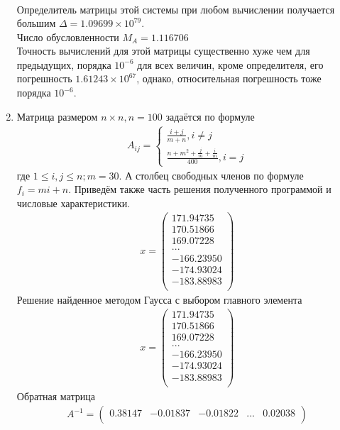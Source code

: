 \documentclass[a4paper,12pt,titlepage,finall]{article}
\begin{document}
\begin{enumerate}
\begin{align*}
\end{align*}
Определитель матрицы этой системы при любом вычислении получается большим $\Delta = 1.09699 \times 10^79$.\\
Число обусловленности $M_A = 1.116706$\\
Точность вычислений для этой матрицы существенно хуже чем для предыдущих, порядка $10^{-6}$ для всех величин, кроме определителя, его погрешность $1.61243 \times 10^{67}$, однако, относительная погрешность тоже порядка $10^{-6}$.
\item
Матрица размером $n \times n, n = 100$ задаётся по формуле
\begin{align}
A_{ij} = \left\{
\begin{array}{ll}
\frac{i+j}{m+n}, i \neq j\\
\frac{n + m^2 + \frac{j}{m} + \frac{i}{m}}{400}, i = j
\end{array}
\right.
\end{align}
где $1 \leq i,j \leq n; m = 30$. А столбец свободных членов по формуле $f_i = mi + n$. Приведём также часть решения полученного программой и числовые характеристики.
\begin{align*}
x = \begin{pmatrix}
171.94735 \\
 170.51866 \\
 169.07228 \\
   ...\\
-166.23950 \\
-174.93024 \\
-183.88983 \\
\end{pmatrix}
\end{align*}
Решение найденное методом Гаусса с выбором главного элемента
\begin{align*}
x = \begin{pmatrix}
171.94735 \\
 170.51866 \\
 169.07228 \\
   ...\\
-166.23950 \\
-174.93024 \\
-183.88983 \\
\end{pmatrix}
\end{align*}
Обратная матрица
\begin{align*}
A^{-1} = \begin{pmatrix}
    0.38147&    -0.01837&    -0.01822& ... &     0.02038 \\

\end{pmatrix}
\end{align*}
\end{enumerate}
\end{document}
